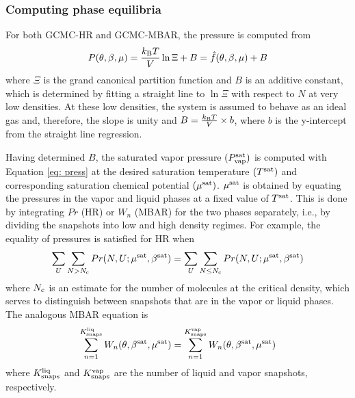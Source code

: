 \documentclass[journal=jced,manuscript=article]{achemso}
\begin{document}
\subsubsection{Computing phase equilibria} \label{sec: Saturation}

For both GCMC-HR and GCMC-MBAR, the pressure is computed from
\begin{equation} \label{eq: press}
P(\theta,\beta,\mu) = \frac{k_{\rm B} T}{V} \ln \Xi + B = \hat f(\theta,\beta,\mu) + B
\end{equation}
where $\Xi$ is the grand canonical partition function and $B$ is an additive constant, which is determined by fitting a straight line to $\ln \Xi$ with respect to $N$ at very low densities. At these low densities, the system is assumed to behave as an ideal gas and, therefore, the slope is unity and $B = \frac{k_{\rm B} T}{V} \times b$, where $b$ is the y-intercept from the straight line regression.

Having determined $B$, the saturated vapor pressure $(P_{\rm vap}^{\rm sat})$ is computed with Equation \ref{eq: press} at the desired saturation temperature $(T^{\rm sat})$ and corresponding saturation chemical potential $(\mu^{\rm sat})$. $\mu^{\rm sat}$ is obtained by equating the pressures in the vapor and liquid phases at a fixed value of $T^{\rm sat}$. This is done by integrating $Pr$ (HR) or $W_{n}$ (MBAR) for the two phases separately, i.e., by dividing the snapshots into low and high density regimes. For example, the equality of pressures is satisfied for HR when
\begin{eqnarray} \label{eq: HR equal press}
\sum_{U} \sum_{N > N_{\rm c}} Pr(N,U;\mu^{\rm sat},\beta^{\rm sat}) = \sum_{U} \sum_{N \leq N_{\rm c}} Pr(N,U;\mu^{\rm sat},\beta^{\rm sat})
\end{eqnarray}
where $N_{\rm c}$ is an estimate for the number of molecules at the critical density, which serves to distinguish between snapshots that are in the vapor or liquid phases. The analogous MBAR equation is
\begin{eqnarray} \label{eq: MBAR equal press}
\sum_{n=1}^{K^{\rm liq}_{\rm snaps}} W_{n}(\theta,\beta^{\rm sat},\mu^{\rm sat}) = \sum_{n=1}^{K^{\rm vap}_{\rm snaps}} W_{n}(\theta,\beta^{\rm sat},\mu^{\rm sat})
\end{eqnarray}
where $K^{\rm liq}_{\rm snaps}$ and $K^{\rm vap}_{\rm snaps}$ are the number of liquid and vapor snapshots, respectively.
\end{document}
